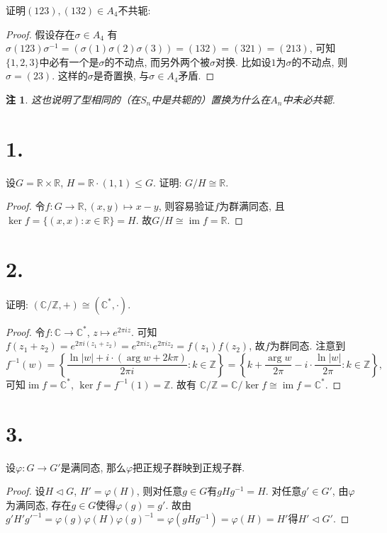 \documentclass[12pt, a4paper, fontset=windows]{ctexart}
\newcommand{\C}{\mathbb{C}}
\newcommand{\R}{\mathbb{R}}
\newcommand{\Z}{\mathbb{Z}}
\newcommand{\abs}[1]{\left|{#1}\right|}
\newcommand{\im}{\operatorname{im}}
\newcommand{\isom}{\cong} %
\newcommand{\kh}[1]{（{#1}）} %
\newtheorem*{remark}{注}
\begin{document}
证明$(123),(132)\in A_4$不共轭: 

\begin{proof}
假设存在$\sigma\in A_4$
有$\sigma(123)\sigma^{-1}=(\sigma(1)\sigma(2)\sigma(3))=(132)=(321)=(213)$, 
可知$\{1,2,3\}$中必有一个是$\sigma$的不动点, 而另外两个被$\sigma$对换. 
比如设$1$为$\sigma$的不动点, 则$\sigma=(23)$. 这样的$\sigma$是奇置换, 
与$\sigma\in A_4$矛盾. 
\end{proof}

\begin{remark}
这也说明了型相同的\kh{在$S_n$中是共轭的}置换为什么在$A_n$中未必共轭. 
\end{remark}

\section*{1.}

设$G=\R\times\R$, $H=\R\cdot(1,1)\le G$. 证明: $G/H\isom\R$. 

\begin{proof}
令$f:G\to\R,(x,y)\mapsto x-y$, 则容易验证$f$为群满同态, 
且$\ker f=\{(x,x):x\in\R\}=H$. 故$G/H\isom\im f=\R$.
\end{proof}

\section*{2.}
\label{C-exp}

证明: $(\C/\Z,+)\isom(\C^*,\cdot)$.

\begin{proof}
令$f:\C\to\C^*$, $z\mapsto e^{2\pi iz}$. 
可知$f(z_1+z_2)=e^{2\pi i(z_1+z_2)}=e^{2\pi iz_1}e^{2\pi iz_2}=f(z_1)f(z_2)$, 
故$f$为群同态. 注意到
\[f^{-1}(w)=\left\{\frac{\ln\abs{w}+i\cdot(\arg w+2k\pi)}{2\pi i}:k\in\Z\right\}=\left\{k+\frac{\arg w}{2\pi}-i\cdot\frac{\ln|w|}{2\pi}:k\in\Z\right\},\] 
可知$\im f=\C^*$, $\ker f=f^{-1}(1)=\Z$. 故有
$\C/\Z=\C/\ker f\isom\im f=\C^*$. 
\end{proof}

\section*{3.}

设$\varphi:G\to G'$是满同态, 那么$\varphi$把正规子群映到正规子群. 

\begin{proof}
设$H\lhd G$, $H'=\varphi(H)$, 则对任意$g\in G$有$gHg^{-1}=H$. 
对任意$g'\in G'$, 由$\varphi$为满同态, 存在$g\in G$使得$\varphi(g)=g'$. 故由
$g'H'g'^{-1}=\varphi(g)\varphi(H)\varphi(g)^{-1}
=\varphi(gHg^{-1})=\varphi(H)=H'$得$H'\lhd G'$. 
\end{proof}
\end{document}
